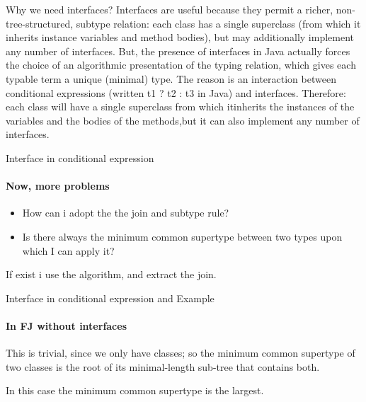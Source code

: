 \documentclass{beamer}
\begin{document}
\begin{frame}{Why we need interfaces?}
    Interfaces are useful because they permit a richer, non-tree-structured, subtype relation: each class has a single superclass (from which it inherits instance variables and method bodies), but may additionally implement any number of interfaces.\newline\newline
    But, the presence of interfaces in Java actually forces the choice of an algorithmic presentation of the typing relation, which gives each typable term a unique (minimal) type. The reason is an interaction between conditional expressions (written t1 ? t2 : t3 in Java) and interfaces.\newline\newline
    Therefore: each class will have a single superclass from which itinherits the instances of the variables and the bodies of the methods,but it can also implement any number of interfaces.

\end{frame}

\begin{frame}{Interface in conditional expression}
\framesubtitle{Now, more problems}
\begin{itemize}
    \item  How can i adopt the the join and subtype rule?
    \item  Is there always the minimum common supertype between two types upon which I can apply it?
    \end{itemize}
If exist i use the algorithm, and extract the join.
\end{frame}


\begin{frame}{Interface in conditional expression and Example}
\framesubtitle{In FJ without interfaces}
This is trivial, since we only have classes; so the minimum common supertype of two classes is the root of its minimal-length sub-tree that contains both.
    \begin{center}
\end{center}
In this case the minimum common supertype is the largest.
\end{frame}
\end{document}
